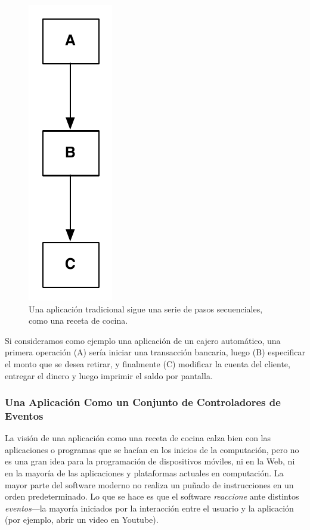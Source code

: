 \documentclass[letterpaper]{article}
\begin{document}
\begin{figure}[H]
\centering
\includegraphics[scale=0.5]{figures/Lineal}
\caption{Una aplicación tradicional sigue una serie de pasos
  secuenciales, como una receta de cocina.}
\label{fig:lineal}
\end{figure}

Si consideramos como ejemplo una aplicación de un cajero automático,
una primera operación (A) sería iniciar una transacción bancaria,
luego (B) especificar el monto que se desea retirar, y finalmente (C)
modificar la cuenta del cliente, entregar el dinero y luego imprimir
el saldo por pantalla.

\subsubsection*{Una Aplicación Como un Conjunto de Controladores de
  Eventos}

La visión de una aplicación como una receta de cocina calza bien con
las aplicaciones o programas que se hacían en los inicios de la
computación, pero no es una gran idea para la programación de
dispositivos móviles, ni en la Web, ni en la mayoría de las
aplicaciones y plataformas actuales en computación. La mayor parte del
software moderno no realiza un puñado de instrucciones en un orden
predeterminado. Lo que se hace es que el software \emph{reaccione}
ante distintos \emph{eventos}---la mayoría iniciados por la
interacción entre el usuario y la aplicación (por ejemplo, abrir un
video en Youtube).
\end{document}
